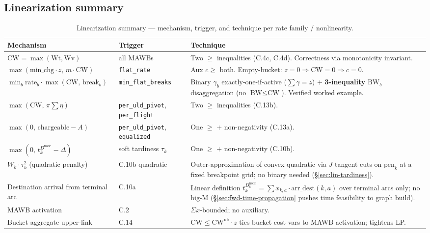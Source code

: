 \documentclass[11pt,a4paper]{article}
\theoremstyle{definition}
\begin{document}
\subsection{Linearization summary}
\label{sec:lin-summary}

\begin{table}[H]
\centering
\caption{Linearization summary --- mechanism, trigger, and technique per rate family / nonlinearity.}
\label{tab:lin-summary}
\begin{tabular}{p{4.0cm}p{4.0cm}p{6.5cm}}
\toprule
Mechanism & Trigger & Technique \\
\midrule
$\text{CW} = \max(\text{Wt}, \text{Wv})$ & all MAWBs & Two $\geq$ inequalities (C.4c, C.4d). Correctness via monotonicity invariant. \\
$\max(\text{min\_chg} \cdot z,\, m \cdot \text{CW})$ & \texttt{flat\_rate} & Aux $c \geq$ both. Empty-bucket: $z = 0 \Rightarrow \text{CW} = 0 \Rightarrow c = 0$. \\
$\min_b \text{rate}_b \cdot \max(\text{CW},\, \text{break}_b)$ & \texttt{min\_flat\_breaks} & Binary $\gamma_b$ exactly-one-if-active ($\sum \gamma = z$) $+$ \textbf{3-inequality} $\text{BW}_b$ disaggregation (no $\text{BW} \leq \text{CW}$). Verified worked example. \\
$\max(\text{CW},\, \pi \sum \eta)$ & \texttt{per\_uld\_pivot}, \texttt{per\_flight} & Two $\geq$ inequalities (C.13b). \\
$\max(0,\, \text{chargeable} - A)$ & \texttt{per\_uld\_pivot}, \texttt{equalized} & One $\geq$ $+$ non-negativity (C.13a). \\
$\max(0,\, t_k^{D^{\text{node}}} - \Delta)$ & soft tardiness $\tau_k$ & One $\geq$ $+$ non-negativity (C.10b). \\
$W_k \cdot \tau_k^2$ (quadratic penalty) & C.10b quadratic & Outer-approximation of convex quadratic via $J$ tangent cuts on $\text{pen}_k$ at a fixed breakpoint grid; no binary needed (\S\ref{sec:lin-tardiness}). \\
Destination arrival from terminal arc & C.10a & Linear definition $t_k^{D_k^{\text{node}}} = \sum x_{k,a} \cdot \text{arr\_dest}(k,a)$ over terminal arcs only; no big-M (\S\ref{sec:fwd-time-propagation} pushes time feasibility to graph build). \\
MAWB activation & C.2 & $\Sigma x$-bounded; no auxiliary. \\
Bucket aggregate upper-link & C.14 & $\text{CW} \leq \text{CW}^{\text{ub}} \cdot z$ ties bucket cost vars to MAWB activation; tightens LP. \\
\bottomrule
\end{tabular}
\end{table}
\end{document}

